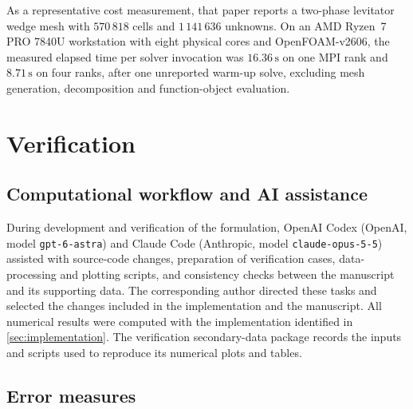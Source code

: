 \documentclass[final,12pt,nopreprintline,longtitle]{elsarticle}
\begin{document}
As a representative cost measurement, that paper reports a two-phase
levitator wedge mesh with $570\,818$ cells and $1\,141\,636$ unknowns.  On an
AMD Ryzen~7 PRO 7840U workstation with eight physical cores and
OpenFOAM-v2606, the measured elapsed time per solver invocation was
$16.36\,\mathrm{s}$ on one MPI rank and $8.71\,\mathrm{s}$ on four ranks,
after one unreported warm-up solve, excluding mesh generation, decomposition
and function-object evaluation.

\section{Verification}
\label{sec:verification}

\subsection{Computational workflow and AI assistance}
\label{sec:aiWorkflow}

During development and verification of the formulation, OpenAI Codex (OpenAI, model
\texttt{gpt-6-astra}) and Claude Code (Anthropic, model \texttt{claude-opus-5-5})  assisted with source-code changes, preparation of
verification cases, data-processing and plotting scripts, and consistency
checks between the manuscript and its supporting data.  The corresponding author directed these tasks and selected the
changes included in the implementation and the manuscript.  All numerical
results were computed with the implementation identified in
\cref{sec:implementation}.  The verification
secondary-data package records the inputs and scripts used to reproduce its
numerical plots and tables.

\subsection{Error measures}
\label{sec:errorMeasures}
\end{document}
